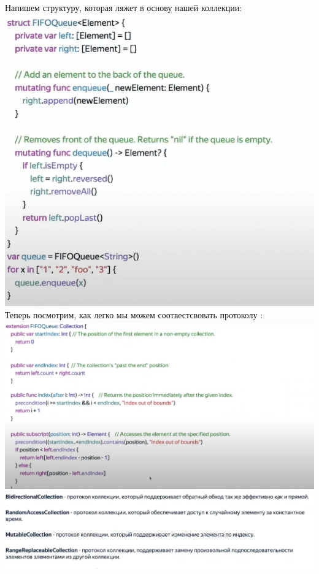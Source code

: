 \documentclass{article}
\begin{document}
    \newline
    Напишем структуру, которая ляжет в основу нашей коллекции:
    \newline
    \includegraphics[scale = 0.5]{pic/Снимок экрана 2023-07-29 в 00.38.42.png}
    \newline
    Теперь посмотрим, как легко мы можем соотвестсвовать протоколу :
    \newline
    \includegraphics[scale = 0.3]{pic/Снимок экрана 2023-07-29 в 00.39.52.png}
    \newline
    \includegraphics[scale = 0.3]{pic/Снимок экрана 2023-07-29 в 00.43.00.png}
\end{document}

